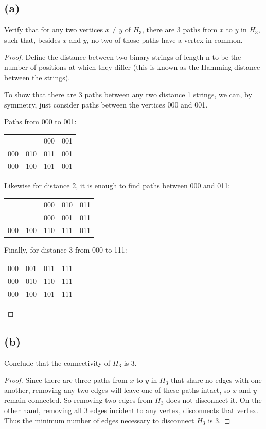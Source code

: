 \documentclass[14pt]{extarticle}
\begin{document}
\subsection{(a)}
Verify that for any two vertices $x \neq y$ of $H_3$, there are 3 paths from $x$ to $y$ in $H_3$, such that, besides $x$ and $y$, no two of those paths have a vertex in common.
\begin{proof}
Define the distance between two binary strings of length n to be the number of positions at which they differ (this is known as the Hamming distance between the strings).

To show that there are 3 paths between any two distance 1 strings, we can, by symmetry, just consider paths between the vertices 000 and 001.

Paths from 000 to 001:

\begin{center}
\begin{tabular}{cccc}
& & 000 & 001 \\
000 & 010 & 011 & 001 \\
000 & 100 & 101 & 001 \\
\end{tabular}
\end{center}

Likewise for distance 2, it is enough to find paths between 000 and 011:

\begin{center}
\begin{tabular}{ccccc}
& & 000 & 010 & 011 \\
& & 000 & 001 & 011 \\
000 & 100 & 110 & 111 & 011 \\
\end{tabular}
\end{center}

Finally, for distance 3 from 000 to 111:

\begin{center}
\begin{tabular}{cccc}
000 & 001 & 011 & 111 \\
000 & 010 & 110 & 111 \\
000 & 100 & 101 & 111 \\
\end{tabular}
\end{center}

\end{proof}

\subsection{(b)}
Conclude that the connectivity of $H_3$ is 3.
\begin{proof}
Since there are three paths from $x$ to $y$ in $H_3$ that share no edges with one another, removing any two edges will leave one of these paths intact, so $x$ and $y$ remain connected. So removing two edges from $H_3$ does not disconnect it. On the other hand, removing all 3 edges incident to any vertex, disconnects that vertex. Thus the minimum number of edges necessary to disconnect $H_3$ is 3.
\end{proof}
\end{document}
